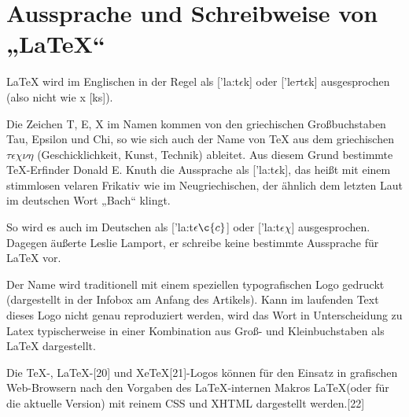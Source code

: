 
\section{Aussprache und Schreibweise von „\LaTeX“}

LaTeX wird im Englischen in der Regel als ['la:t$\epsilon$k] oder ['le$\tau$t$\epsilon$k] ausgesprochen (also nicht wie x [ks]).

Die Zeichen T, E, X im Namen kommen von den griechischen Großbuchstaben Tau, Epsilon und Chi, so wie sich auch der Name von TeX aus dem griechischen $\tau\epsilon\chi\nu\eta$ (Geschicklichkeit, Kunst, Technik) ableitet. Aus diesem Grund bestimmte TeX-Erfinder Donald E. Knuth die Aussprache als ['la:t$\epsilon$k],\cite{Knuth} das heißt mit einem stimmlosen velaren Frikativ wie im Neugriechischen, der ähnlich dem letzten Laut im deutschen Wort „Bach“ klingt.

So wird es auch im Deutschen als ['la:t$\epsilon\c{c}$] oder ['la:t$\epsilon \chi$] ausgesprochen. Dagegen äußerte Leslie Lamport, er schreibe keine bestimmte Aussprache für LaTeX vor.

Der Name wird traditionell mit einem speziellen typografischen Logo gedruckt (dargestellt in der Infobox am Anfang des Artikels). Kann im laufenden Text dieses Logo nicht genau reproduziert werden, wird das Wort in Unterscheidung zu Latex typischerweise in einer Kombination aus Groß- und Kleinbuchstaben als LaTeX dargestellt.

Die TeX-, LaTeX-[20] und XeTeX[21]-Logos können für den Einsatz in grafischen Web-Browsern nach den Vorgaben des LaTeX-internen Makros \LaTeX (oder \LaTeXe für die aktuelle Version) mit reinem CSS und XHTML dargestellt werden.[22]